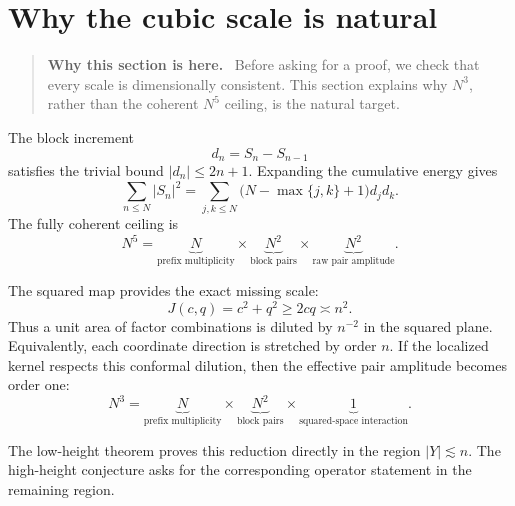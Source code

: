 \documentclass[11pt]{article}
\theoremstyle{definition}
\theoremstyle{remark}
\newcommand{\1}{\mathbf{1}}
\newenvironment{motivation}
  {\begin{quote}\small\color{ovvogray}\textbf{Why this section is here.}\ }
  {\end{quote}}
\begin{document}

\section{Why the cubic scale is natural}
\label{sec:exponent-accounting}

\begin{motivation}
Before asking for a proof, we check that every scale is dimensionally consistent.  This section explains why $N^3$, rather than the coherent $N^5$ ceiling, is the natural target.
\end{motivation}

The block increment
\begin{equation}
 d_n=S_n-S_{n-1}
 \label{eq:d-n}
\end{equation}
satisfies the trivial bound $|d_n|\le2n+1$.  Expanding the cumulative energy gives
\begin{equation}
 \sum_{n\le N}|S_n|^2
 =
 \sum_{j,k\le N}
 \bigl(N-\max\{j,k\}+1\bigr)d_jd_k.
 \label{eq:triangular-energy}
\end{equation}
The fully coherent ceiling is
\begin{equation}
 N^5
 =
 \underbrace{N}_{\text{prefix multiplicity}}
 \times
 \underbrace{N^2}_{\text{block pairs}}
 \times
 \underbrace{N^2}_{\text{raw pair amplitude}}.
 \label{eq:N5-accounting}
\end{equation}

The squared map provides the exact missing scale:
\begin{equation}
 J(c,q)=c^2+q^2\ge2cq\asymp n^2.
 \label{eq:two-power-J}
\end{equation}
Thus a unit area of factor combinations is diluted by $n^{-2}$ in the squared plane.  Equivalently, each coordinate direction is stretched by order $n$.  If the localized kernel respects this conformal dilution, then the effective pair amplitude becomes order one:
\begin{equation}
 N^3
 =
 \underbrace{N}_{\text{prefix multiplicity}}
 \times
 \underbrace{N^2}_{\text{block pairs}}
 \times
 \underbrace{1}_{\text{squared-space interaction}}.
 \label{eq:N3-accounting}
\end{equation}

The low-height theorem proves this reduction directly in the region $|Y|\lesssim n$.  The high-height conjecture asks for the corresponding operator statement in the remaining region.
\end{document}
